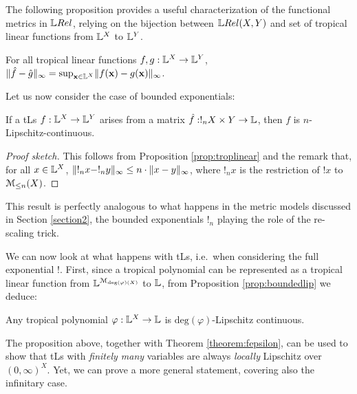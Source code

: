The following proposition provides a useful characterization of the functional metrics in $\LREL$, relying on 
the bijection between $\HOM{\LREL}{X}{Y}$ and set of tropical linear functions from $\mathbb{L}^{X}$ to $\mathbb{L}^{Y}$.
\begin{proposition}
For all tropical linear functions $f,g:\mathbb{L}^{X}\to \mathbb{L}^{Y}$, $\lVert \hat{f}-\hat{g}\rVert_{\infty} =  \sup_{\mathbf{x}\in \mathbb{L}^{X}}
\lVert f(\mathbf{x})-g(\mathbf{x})\rVert_{\infty}$.\end{proposition}

Let us now consider the case of bounded exponentials:
\begin{proposition}\label{prop:boundedlip}
If a tLs $f: \mathbb{L}^{X}\to \mathbb{L}^{Y}$ arises from a matrix $\hat{f}:!_{n}X\times Y\to \mathbb{L}$, then $f$ is $n$-Lipschitz-continuous.
\end{proposition}
\begin{proof}[Proof sketch]
This follows from Proposition \ref{prop:troplinear} and the remark that, for all $x\in \mathbb{L}^{X}$, $\lVert !_{n} x-!_{n} y\rVert_{\infty}\leq n\cdot \lVert x- y\rVert_{\infty}$, where $!_{n} x$ is the restriction of $! x$ to $\mathcal{M}_{\leq n}(X)$.%
\end{proof}
This result is perfectly analogous to what happens in the metric models discussed in Section \ref{section2}, the bounded exponentials $!_{n}$ playing the role of the re-scaling trick.

We can now look at what happens with tLs, i.e.~when considering the full exponential $!$.
First, since a tropical polynomial can be represented as a tropical linear function from $\mathbb{L}^{\mathcal{M}_{\mathrm{deg}(\varphi)(X)}}$ to $\mathbb{L}$, from Proposition \ref{prop:boundedlip} we deduce:
\begin{proposition}\label{prop:polylip}
Any tropical polynomial $\varphi:\mathbb{L}^{X}\to\mathbb{L}$ is $\mathrm{deg}(\varphi)$-Lipschitz continuous.
\end{proposition}

The proposition above, together with Theorem \ref{theorem:fepsilon}, can be used to show that tLs with \emph{finitely many} variables are always \emph{locally} Lipschitz over $(0,\infty)^{X}$. Yet, we can prove a more general statement, covering also the infinitary case.


